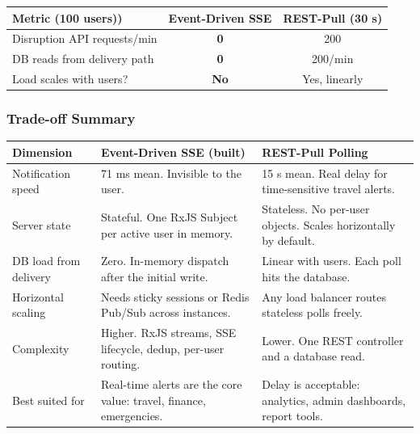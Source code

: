 \documentclass[12pt,a4paper]{article}
\begin{document}
\begin{center}
\begin{tabular}{@{}lcc@{}}
\toprule
\textbf{Metric (100 users))} & \textbf{Event-Driven SSE} & \textbf{REST-Pull (30 s)} \\
\midrule
Disruption API requests/min & \textcolor{successgreen}{\textbf{0}} & \textcolor{warningorange}{200} \\
DB reads from delivery path & \textcolor{successgreen}{\textbf{0}} & \textcolor{warningorange}{200/min} \\
Load scales with users? & \textcolor{successgreen}{\textbf{No}} & \textcolor{warningorange}{Yes, linearly} \\
\bottomrule
\end{tabular}
\end{center}

\subsubsection{Trade-off Summary}

\begin{longtable}{@{}L{2.8cm}L{5.5cm}L{5.5cm}@{}}
\toprule
\textbf{Dimension} & \textbf{Event-Driven SSE (built)} & \textbf{REST-Pull Polling} \\
\midrule
\endhead

Notification speed &
  \textcolor{successgreen}{71 ms mean.} Invisible to the user. &
  \textcolor{warningorange}{15 s mean.} Real delay for time-sensitive travel alerts. \\[0.4em]

Server state &
  \textcolor{warningorange}{Stateful.} One RxJS Subject per active user in memory. &
  \textcolor{successgreen}{Stateless.} No per-user objects. Scales horizontally by default. \\[0.4em]

DB load from delivery &
  \textcolor{successgreen}{Zero.} In-memory dispatch after the initial write. &
  \textcolor{warningorange}{Linear with users.} Each poll hits the database. \\[0.4em]

Horizontal scaling &
  \textcolor{warningorange}{Needs sticky sessions or Redis Pub/Sub} across instances. &
  \textcolor{successgreen}{Any load balancer routes stateless polls freely.} \\[0.4em]

Complexity &
  \textcolor{warningorange}{Higher.} RxJS streams, SSE lifecycle, dedup, per-user routing. &
  \textcolor{successgreen}{Lower.} One REST controller and a database read. \\[0.4em]

Best suited for &
  Real-time alerts are the core value: travel, finance, emergencies. &
  Delay is acceptable: analytics, admin dashboards, report tools. \\

\bottomrule
\end{longtable}
\end{document}
